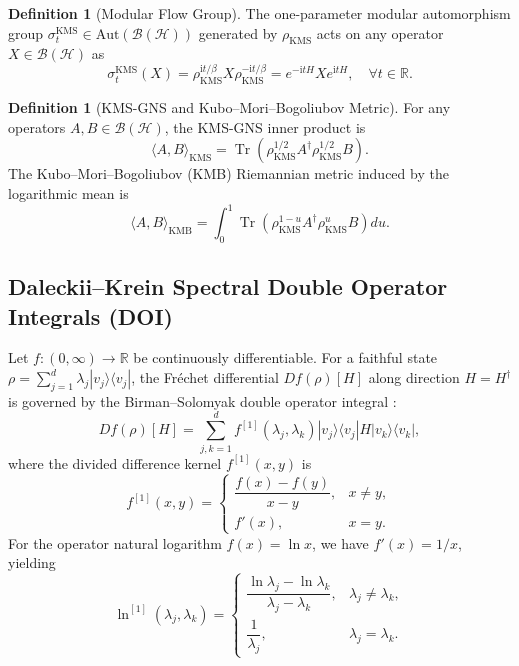 \documentclass[11pt,a4paper]{article}
\theoremstyle{plain}
\theoremstyle{definition}
\newtheorem{definition}[theorem]{Definition}
\DeclareMathOperator{\Tr}{Tr}
\newcommand{\KMS}{\mathrm{KMS}}
\begin{document}
\begin{definition}[Modular Flow Group]
The one-parameter modular automorphism group $\sigma_t^{\KMS} \in \mathrm{Aut}(\mathcal{B}(\mathcal{H}))$ generated by $\rho_{\KMS}$ acts on any operator $X \in \mathcal{B}(\mathcal{H})$ as
\begin{equation}
\sigma_t^{\KMS}(X) = \rho_{\KMS}^{\mathrm{i}t/\beta} X \rho_{\KMS}^{-\mathrm{i}t/\beta} = e^{-\mathrm{i}t H} X e^{\mathrm{i}t H}, \quad \forall t \in \mathbb{R}.
\end{equation}
\end{definition}

\begin{definition}[KMS-GNS and Kubo--Mori--Bogoliubov Metric]
For any operators $A, B \in \mathcal{B}(\mathcal{H})$, the KMS-GNS inner product is
\begin{equation}
\langle A, B \rangle_{\KMS} = \Tr\left( \rho_{\KMS}^{1/2} A^\dagger \rho_{\KMS}^{1/2} B \right).
\end{equation}
The Kubo--Mori--Bogoliubov (KMB) Riemannian metric induced by the logarithmic mean is
\begin{equation}
\langle A, B \rangle_{\mathrm{KMB}} = \int_0^1 \Tr\left( \rho_{\KMS}^{1-u} A^\dagger \rho_{\KMS}^u B \right) du.
\label{eq:kmb_integral_def}
\end{equation}
\end{definition}

\subsection{Daleckii--Krein Spectral Double Operator Integrals (DOI)}
Let $f: (0, \infty) \to \mathbb{R}$ be continuously differentiable. For a faithful state $\rho = \sum_{j=1}^d \lambda_j |v_j\rangle\langle v_j|$, the Fr\'{e}chet differential $Df(\rho)[H]$ along direction $H = H^\dagger$ is governed by the Birman--Solomyak double operator integral \cite{DaleckiiKrein1956,BirmanSolomyak2003,Bhatia1997}:
\begin{equation}
Df(\rho)[H] = \sum_{j,k=1}^d f^{[1]}(\lambda_j, \lambda_k) |v_j\rangle\langle v_j| H |v_k\rangle\langle v_k|,
\label{eq:doi_formula}
\end{equation}
where the divided difference kernel $f^{[1]}(x, y)$ is
\begin{equation}
f^{[1]}(x, y) = \begin{cases}
\dfrac{f(x) - f(y)}{x - y}, & x \neq y, \\
f'(x), & x = y.
\end{cases}
\end{equation}
For the operator natural logarithm $f(x) = \ln x$, we have $f'(x) = 1/x$, yielding
\begin{equation}
\ln^{[1]}(\lambda_j, \lambda_k) = \begin{cases}
\dfrac{\ln\lambda_j - \ln\lambda_k}{\lambda_j - \lambda_k}, & \lambda_j \neq \lambda_k, \\
\dfrac{1}{\lambda_j}, & \lambda_j = \lambda_k.
\end{cases}
\label{eq:log_divided_diff}
\end{equation}
\end{document}
